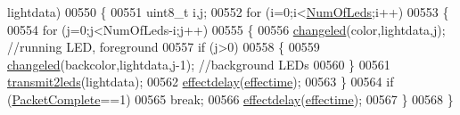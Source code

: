 \begin{DoxyCode}
      lightdata)
00550 \{
00551     uint8\_t i,j;
00552     \textcolor{keywordflow}{for} (i=0;i<\hyperlink{globals_8h_ad5db4045aed262ed4aae2af9d81fab98}{NumOfLeds};i++)
00553     \{
00554         \textcolor{keywordflow}{for} (j=0;j<NumOfLeds-i;j++)
00555         \{
00556             \hyperlink{_lightstribe_8c_a63fa595d401f0e85c1bba55ba2b1d66e}{changeled}(color,lightdata,j);          \textcolor{comment}{//running LED, foreground}
00557             \textcolor{keywordflow}{if} (j>0)
00558             \{
00559                 \hyperlink{_lightstribe_8c_a63fa595d401f0e85c1bba55ba2b1d66e}{changeled}(backcolor,lightdata,j-1);    \textcolor{comment}{//background LEDs}
00560             \}
00561             \hyperlink{_lightstribe_8c_aac724dad670e4a26723daf71ce6a8d8a}{transmit2leds}(lightdata);
00562             \hyperlink{_led_effects_8c_a6950e7657ba74d0d490ba36427533c4b}{effectdelay}(\hyperlink{globals_8h_ac2445d316b2972d381edeac44bb6a226}{effectime});
00563         \}
00564         \textcolor{keywordflow}{if} (\hyperlink{globals_8h_a1b09d1a5bcf4c8ab435bb3c9e36def59}{PacketComplete}==1)
00565             \textcolor{keywordflow}{break};
00566         \hyperlink{_led_effects_8c_a6950e7657ba74d0d490ba36427533c4b}{effectdelay}(\hyperlink{globals_8h_ac2445d316b2972d381edeac44bb6a226}{effectime});
00567     \}
00568 \}
\end{DoxyCode}
